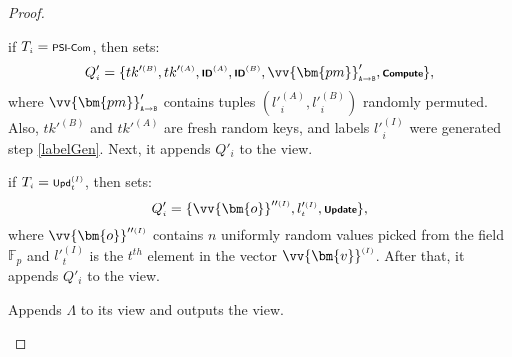 \begin{proof}
\begin{packed_enum}
\begin{packed_enum}
\item if $T_{\scriptscriptstyle i}= \textsf {\scriptsize PSI-Com}$, then sets: 
\begin{equation*}
Q'_{\scriptscriptstyle  i}=\{tk'^{\scriptscriptstyle  (B)}, tk'^{\scriptscriptstyle  (A)},\textsf {\scriptsize \textbf{ID}}^{\scriptscriptstyle  (A)},  \textsf {\scriptsize \textbf{ID}}^{\scriptscriptstyle  (B)},  \vv{\bm{pm}}'_{\scriptscriptstyle \mathtt{ A \rightarrow B}}, \textsf {\scriptsize \textbf{Compute}}\}, 
\end{equation*}
where  $\vv{\bm{pm}}'_{\scriptscriptstyle \mathtt{ A \rightarrow B}}$ contains tuples $(l'^{\scriptscriptstyle  (A)}_{\scriptscriptstyle i},l'^{\scriptscriptstyle  (B)}_{\scriptscriptstyle i})$ randomly permuted. Also, $tk'^{\scriptscriptstyle  (B)}$ and $tk'^{\scriptscriptstyle  (A)}$ are fresh random keys,  and  labels $l'^{\scriptscriptstyle  (I)}_{\scriptscriptstyle i}$ were generated step \ref{labelGen}.  Next, it appends $Q'_{\scriptscriptstyle  i}$ to the view. 
\item if $T_{\scriptscriptstyle i}= \textsf {\scriptsize Upd}^{\scriptscriptstyle (I)}_{\scriptscriptstyle t}$, then sets: 
\begin{equation*}
Q'_{\scriptscriptstyle  i}=\{\vv{\bm{o}}''^{\scriptscriptstyle (I)}, l'^{\scriptscriptstyle (I)}_{\scriptscriptstyle t},\textsf {\scriptsize \textbf{Update}}\},
\end{equation*}
 where $\vv{\bm{o}}''^{\scriptscriptstyle (I)}$ contains $n$  uniformly random values picked from the field $\mathbb{F}_p$ and $l'^{\scriptscriptstyle (I)}_{\scriptscriptstyle t}$ is the $t^{\scriptscriptstyle th}$ element in the vector $\vv{\bm{v}}^{\scriptscriptstyle (I)}$. After that, it appends $Q'_{\scriptscriptstyle  i}$ to the view. 
\end{packed_enum}
\item Appends $\Lambda$ to its view and outputs the view.
\end{packed_enum}


\end{proof}
